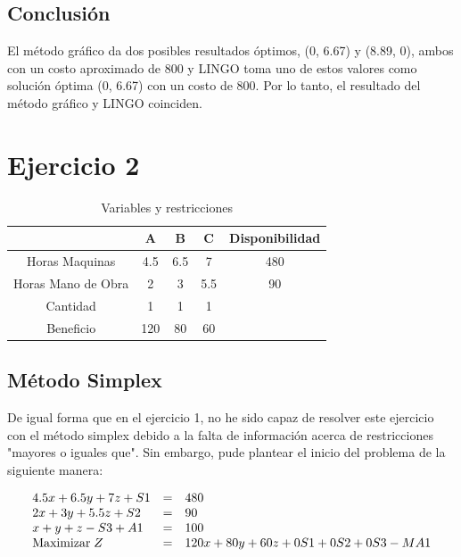 \documentclass[12pt]{article}
\begin{document}
\subsection*{Conclusión}
\noindent El método gráfico da dos posibles resultados óptimos, (0, 6.67) y (8.89, 0), ambos con un costo aproximado de 800 y LINGO toma uno de estos valores como solución óptima (0, 6.67) con un costo de 800. Por lo tanto, el resultado del método gráfico y LINGO coinciden.





\newpage
\section*{Ejercicio 2}

\begin{table}[h]
  \centering
  \begin{tabular}{|c|c|c|c|c|}
  \hline
            & A   & B   & C & Disponibilidad \\ \hline
  Horas Maquinas  & 4.5 & 6.5 & 7 & 480   \\ \hline
  Horas Mano de Obra & 2   & 3  & 5.5 & 90     \\ \hline
  Cantidad    & 1  & 1 & 1 &  \\ \hline
  Beneficio & 120 & 80 & 60 & \\ \hline
  \end{tabular}
  \caption{Variables y restricciones}
  \label{tab:Ejercicio2}
\end{table}

\subsection*{Método Simplex}
\noindent De igual forma que en el ejercicio 1, no he sido capaz de resolver este ejercicio con el método simplex debido a la falta de información acerca de restricciones "mayores o iguales que".
Sin embargo, pude plantear el inicio del problema de la siguiente manera:

\[
\begin{array}{l l l}
4.5x + 6.5y + 7z + S1 & = & 480 \\
2x + 3y + 5.5z + S2 & = & 90 \\
x + y + z - S3 + A1 & = & 100 \\
\text{Maximizar}\;Z & = & 120x + 80y + 60z + 0S1 + 0S2 + 0S3 - MA1\\
\end{array}
\]
\end{document}
